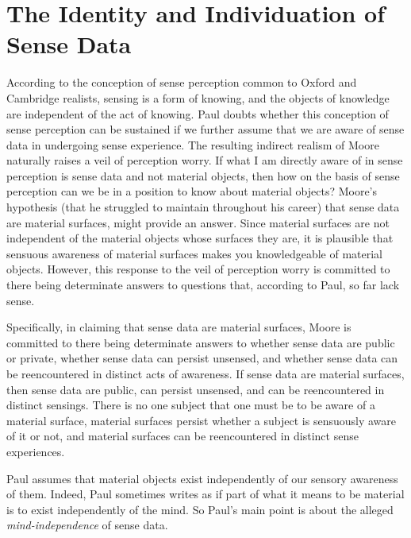 \documentclass[11pt]{article}
\begin{document}

\section{The Identity and Individuation of Sense Data} %
\label{sec:the_identity_and_individuation_of_sense_data}

According to the conception of sense perception common to Oxford and Cambridge realists, sensing is a form of knowing, and the objects of knowledge are independent of the act of knowing. Paul doubts whether this conception of sense perception can be sustained if we further assume that we are aware of sense data in undergoing sense experience. The resulting indirect realism of Moore naturally raises a veil of perception worry. If what I am directly aware of in sense perception is sense data and not material objects, then how on the basis of sense perception can we be in a position to know about material objects? Moore's hypothesis (that he struggled to maintain throughout his career) that sense data are material surfaces, might provide an answer. Since material surfaces are not independent of the material objects whose surfaces they are, it is plausible that sensuous awareness of material surfaces makes you knowledgeable of material objects. However, this response to the veil of perception worry is committed to there being determinate answers to questions that, according to Paul, so far lack sense.

Specifically, in claiming that sense data are material surfaces, Moore is committed to there being determinate answers to whether sense data are public or private, whether sense data can persist unsensed, and whether sense data can be reencountered in distinct acts of awareness. If sense data are material surfaces, then sense data are public, can persist unsensed, and can be reencountered in distinct sensings. There is no one subject that one must be to be aware of a material surface, material surfaces persist whether a subject is sensuously aware of it or not, and material surfaces can be reencountered in distinct sense experiences.

Paul assumes that material objects exist independently of our sensory awareness of them. Indeed, Paul sometimes writes as if part of what it means to be material is to exist independently of the mind. So Paul's main point is about the alleged \emph{mind-independence} of sense data.
\end{document}
